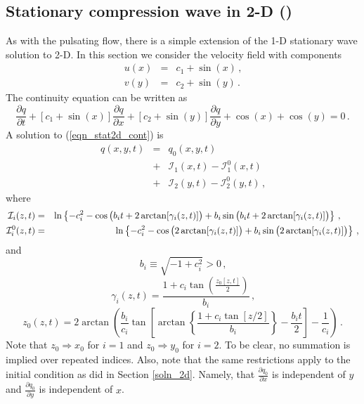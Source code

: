 \documentclass[11pt]{book}
\begin{document}
\subsection{Stationary compression wave in 2-D (\texorpdfstring{}{compression\_wave})}
\label{stationary_2d}

As with the pulsating flow, there is a simple extension of the 1-D stationary wave solution to 2-D.  In this section we consider the velocity field with components
\begin{eqnarray}
u(x) &=& c_1 + \sin(x) \,\mbox{,} \\
v(y) &=& c_2 + \sin(y) \,\mbox{.}
\end{eqnarray}
The continuity equation can be written as
\begin{equation}
\label{eqn_stat2d_cont}
\frac{\partial q}{\partial t} + [c_1 + \sin(x)] \frac{\partial q}{\partial x} + [c_2 + \sin(y)] \frac{\partial q}{\partial y} + \cos(x) + \cos(y) = 0 \,\mbox{.}
\end{equation}
A solution to (\ref{eqn_stat2d_cont}) is
\begin{eqnarray}
\label{eqn_stat2d_soln}
q(x,y,t) &=& q_0(x,y,t) \nonumber\\
&+& \mathcal{I}_1(x,t) - \mathcal{I}_1^0(x,t) \nonumber\\
&+& \mathcal{I}_2(y,t) - \mathcal{I}_2^0(y,t) \,\mbox{,}
\end{eqnarray}
where
\begin{eqnarray}
\label{eqn_Ii}
\mathcal{I}_i(z,t) &=& \ln\left\{ -c_i^2 - \cos\big(b_i t + 2\arctan[\gamma_i(z,t)] \big) + b_i \sin\big(b_i t + 2\arctan[\gamma_i(z,t)] \big) \right\}\,\mbox{,} \quad\quad  \vspace{0.3cm}\\
\label{eqn_Ii0}
\mathcal{I}_i^0(z,t) &=& \ln\left\{ -c_i^2 - \cos\big(2\arctan[\gamma_i(z,t)] \big) + b_i \sin\big(2\arctan[\gamma_i(z,t)] \big) \right\} \,\mbox{,}
\end{eqnarray}
and
\begin{equation}
b_i \equiv \sqrt{-1 + c_i^2} >0 \,\mbox{,}
\end{equation}
\begin{equation}
\gamma_i(z,t) = \frac{ 1 + c_i \tan\left( \frac{z_0[z,t]}{2} \right) }{b_i} \,\mbox{,}
\end{equation}
\begin{equation}
z_0(z,t) = 2\arctan\left( \frac{b_i}{c_i} \tan \left[ \arctan\left\{ \frac{1+c_i\tan[z/2]}{b_i} \right\} - \frac{b_it}{2} \right] - \frac{1}{c_i} \right) \,\mbox{.}
\end{equation}
Note that $z_0 \Rightarrow x_0$ for $i=1$ and $z_0 \Rightarrow y_0$ for $i=2$.  To be clear, no summation is implied over repeated indices. Also, note that the same restrictions apply to the initial condition as did in Section \ref{soln_2d}. Namely, that $\frac{\partial q_0}{\partial x}$ is independent of $y$ and $\frac{\partial q_0}{\partial y}$ is independent of $x$.
\end{document}
